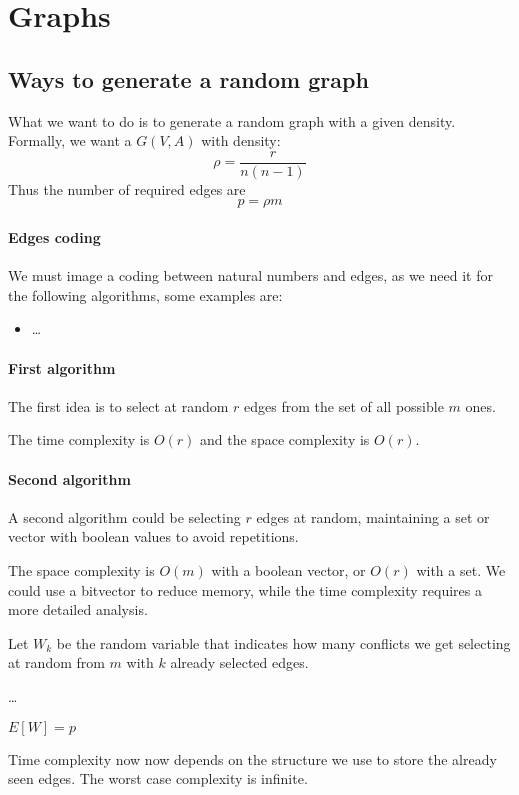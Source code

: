 \section{Graphs}

\subsection{Ways to generate a random graph}

What we want to do is to generate a random graph with a given density.
Formally, we want a $G(V,A)$ with density: 
$$\rho = \frac{r}{n(n-1)}$$
Thus the number of required edges are 
$$p = \rho m$$

\paragraph{Edges coding}
We must image a coding between natural numbers and edges, as we need it 
for the following algorithms, some examples are: 
\begin{itemize}
    \item \dots
\end{itemize}

\paragraph{First algorithm}
The first idea is to select at random $r$ edges from 
the set of all possible $m$ ones. 

The time complexity is $O(r)$ and the space complexity is $O(r)$.

\paragraph{Second algorithm}
A second algorithm could be selecting $r$ edges at random, maintaining 
a set or vector with boolean values to avoid repetitions. 

The space complexity is $O(m)$ with a boolean vector, or $O(r)$ with a set. 
We could use a bitvector to reduce memory, while the time complexity requires 
a more detailed analysis.

Let $W_k$ be the random variable that indicates how many conflicts we 
get selecting at random from $m$ with $k$ already selected edges.

\dots

$E[W] = p$

Time complexity now now depends on the structure we use to store the already seen 
edges. 
The worst case complexity is infinite. 

